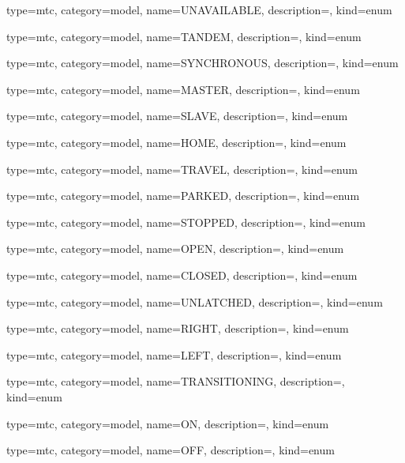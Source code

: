 {
  type=mtc,
  category=model,
  name={UNAVAILABLE},
  description={},
  kind={enum}
}


{
  type=mtc,
  category=model,
  name={TANDEM},
  description={},
  kind={enum}
}


{
  type=mtc,
  category=model,
  name={SYNCHRONOUS},
  description={},
  kind={enum}
}


{
  type=mtc,
  category=model,
  name={MASTER},
  description={},
  kind={enum}
}


{
  type=mtc,
  category=model,
  name={SLAVE},
  description={},
  kind={enum}
}


{
  type=mtc,
  category=model,
  name={HOME},
  description={},
  kind={enum}
}


{
  type=mtc,
  category=model,
  name={TRAVEL},
  description={},
  kind={enum}
}


{
  type=mtc,
  category=model,
  name={PARKED},
  description={},
  kind={enum}
}


{
  type=mtc,
  category=model,
  name={STOPPED},
  description={},
  kind={enum}
}


{
  type=mtc,
  category=model,
  name={OPEN},
  description={},
  kind={enum}
}


{
  type=mtc,
  category=model,
  name={CLOSED},
  description={},
  kind={enum}
}


{
  type=mtc,
  category=model,
  name={UNLATCHED},
  description={},
  kind={enum}
}


{
  type=mtc,
  category=model,
  name={RIGHT},
  description={},
  kind={enum}
}


{
  type=mtc,
  category=model,
  name={LEFT},
  description={},
  kind={enum}
}


{
  type=mtc,
  category=model,
  name={TRANSITIONING},
  description={},
  kind={enum}
}


{
  type=mtc,
  category=model,
  name={ON},
  description={},
  kind={enum}
}


{
  type=mtc,
  category=model,
  name={OFF},
  description={},
  kind={enum}
}


